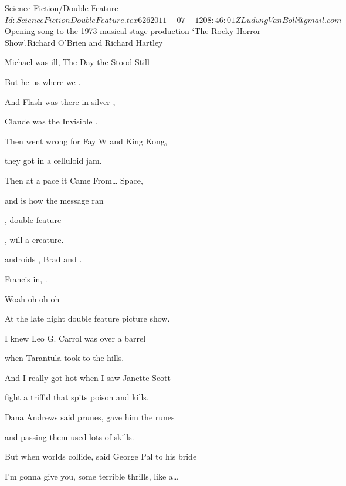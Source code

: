 \begin{SBSong}{Science Fiction/Double Feature}
    {$Id: ScienceFictionDoubleFeature.tex 626 2011-07-12 08:46:01Z LudwigVanBoll@gmail.com $}
    {Opening song to the 1973 musical stage production `The Rocky Horror Show'.}{Richard O'Brien and Richard Hartley}
  \begin{SBVerse}
	Michael  was ill, The Day the  Stood Still
	
	But he  us where we .
	
	And Flash  was there in silver ,
	
	Claude  was the Invisible .
	
	Then  went wrong for Fay W and King Kong,
	
	they got  in a celluloid jam. 
	
	Then at a  pace it Came From\ldots{} Space,
	
	and  is how the message ran
  \end{SBVerse}
  \begin{SBChorus}
	 , double feature 
	
	 , will  a creature. 
	
	 androids , Brad and .
	
	 Francis  in,  .
	
	Woah oh oh  oh
	
	At the late night double feature picture show.
  \end{SBChorus}
  \begin{SBVerse}
	I knew Leo G. Carrol was over a barrel
	
	when Tarantula took to the hills.
	
	And I really got hot when I saw Janette Scott
	
	fight a triffid that spits poison and kills.
	
	Dana Andrews said prunes, gave him the runes
	
	and passing them used lots of skills.
	
	But when worlds collide, said George Pal to his bride
	
	I'm gonna give you, some terrible thrills, like a\dots
  \end{SBVerse}
\end{SBSong}
  